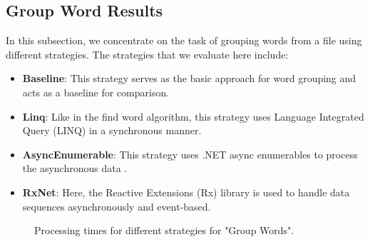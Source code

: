 \subsection{Group Word Results}
\label{subsubsec:group_word_processing_times_cs}
In this subsection, we concentrate on the task of grouping words from a file using different strategies. The strategies that we evaluate here include:
\vspace{-10pt}
\begin{itemize}
    \item \textbf{Baseline}: This strategy serves as the basic approach for word grouping and acts as a baseline for comparison.
    \item \textbf{Linq}: Like in the find word algorithm, this strategy uses Language Integrated Query (LINQ) in a synchronous manner.
    \item \textbf{AsyncEnumerable}: This strategy uses .NET async enumerables to process the asynchronous data .
    \item \textbf{RxNet}: Here, the Reactive Extensions (Rx) library is used to handle data sequences asynchronously and event-based.
\end{itemize}

\begin{figure}[H]
    \centering
    \caption{Processing times for different strategies for "Group Words".}
    \label{fig:group_word_processing_times_cs}
\end{figure}

